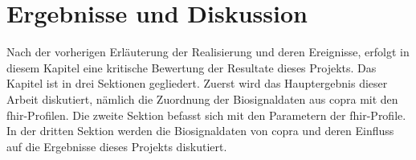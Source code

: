 \chapter{Ergebnisse und Diskussion} \label{ch:discussion}

 Nach der vorherigen Erläuterung der Realisierung und deren Ereignisse, erfolgt in diesem Kapitel eine kritische Bewertung der Resultate dieses Projekts. Das Kapitel ist in drei Sektionen gegliedert. Zuerst wird das Hauptergebnis dieser Arbeit diskutiert, nämlich die Zuordnung der Biosignaldaten aus \ac{copra} mit den \ac{fhir}-Profilen. Die zweite Sektion befasst sich mit den Parametern der \ac{fhir}-Profile. In der dritten Sektion werden die Biosignaldaten von \ac{copra} und deren Einfluss auf die Ergebnisse dieses Projekts diskutiert.